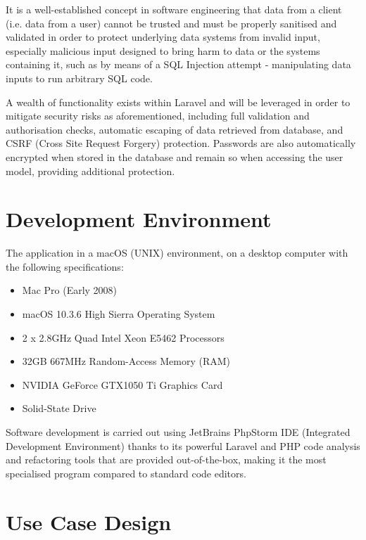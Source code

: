 It is a well-established concept in software engineering that data from a client (i.e. data from a user) cannot be trusted and must be properly sanitised and validated in order to protect underlying data systems from invalid input, especially malicious input designed to bring harm to data or the systems containing it, such as by means of a SQL Injection attempt - manipulating data inputs to run arbitrary SQL code. \cite{CorePHPProgramming} \cite{Microsoft2}

A wealth of functionality exists within Laravel and will be leveraged in order to mitigate security risks as aforementioned, including full validation and authorisation checks, automatic escaping of data retrieved from database, and CSRF (Cross Site Request Forgery) protection. Passwords are also automatically encrypted when stored in the database and remain so when accessing the user model, providing additional protection. \cite{Laravel4} \cite{Laravel5}

\section{Development Environment}
The application in a macOS (UNIX) environment, on a desktop computer with the following specifications:

\begin{itemize}
    \item Mac Pro (Early 2008)
    \item macOS 10.3.6 High Sierra Operating System
    \item 2 x 2.8GHz Quad Intel Xeon E5462 Processors
    \item 32GB 667MHz Random-Access Memory (RAM)
    \item NVIDIA GeForce GTX1050 Ti Graphics Card
    \item Solid-State Drive
\end{itemize}

Software development is carried out using JetBrains PhpStorm IDE (Integrated Development Environment) thanks to its powerful Laravel and PHP code analysis and refactoring tools that are provided out-of-the-box, making it the most specialised program compared to standard code editors. \cite{Jetbrains1}

\section{Use Case Design}


